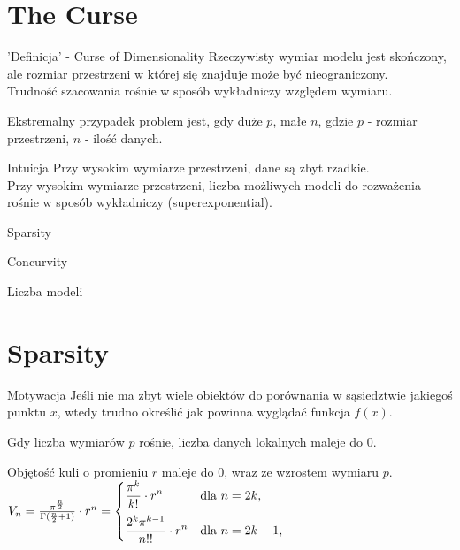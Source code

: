 \documentclass[a4paper]{beamer}
\begin{document}
\section{The Curse}
\begin{frame}
\begin{block}{'Definicja' - Curse of Dimensionality}
Rzeczywisty wymiar modelu jest skończony, ale rozmiar przestrzeni w której się znajduje może być nieograniczony. \\
Trudność szacowania rośnie w sposób wykładniczy względem wymiaru.
\end{block}
Ekstremalny przypadek problem jest, gdy duże $p$, małe $n$, gdzie $p$ - rozmiar przestrzeni, $n$ - ilość danych.
\begin{block}{Intuicja}
Przy wysokim wymiarze przestrzeni, dane są zbyt rzadkie. \\
Przy wysokim wymiarze przestrzeni, liczba możliwych modeli do rozważenia rośnie w sposób wykładniczy (superexponential).

\end{block}
\end{frame}

\begin{frame}
\begin{block}{Sparsity}

\end{block}
\begin{block}{Concurvity}

\end{block}
\begin{block}{Liczba modeli}

\end{block}

\end{frame}

\section{Sparsity}
\begin{frame}
\begin{block}{Motywacja}
Jeśli nie ma zbyt wiele obiektów do porównania w sąsiedztwie jakiegoś punktu $x$, wtedy trudno określić jak powinna wyglądać funkcja $f(x)$.
\end{block}
\begin{block}{}
Gdy liczba wymiarów $p$ rośnie, liczba danych lokalnych maleje do 0. 
\end{block}
\begin{block}{}
Objętość kuli o promieniu $r$ maleje do 0, wraz ze wzrostem wymiaru $p$. \\
$V_{n}=\frac { \pi^{\frac{n}{2}}}{\Gamma (\frac{n}{2}+1)}\cdot r^{n} = \begin{cases} \displaystyle {\pi^k\over k!}\cdot r^n & \mbox{dla }n=2k, \\[2ex] \displaystyle {2^k \pi^{k-1}\over n!!}\cdot r^n & \mbox{dla } n=2k-1, \end{cases}$
\end{block}
\end{frame}
\end{document}
